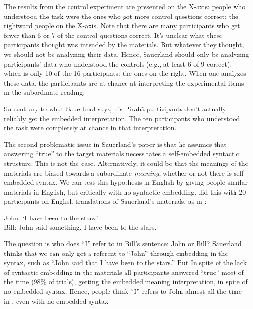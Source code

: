 \documentclass{article}
\begin{document}
The results from the control experiment are presented on the X-axis:  people who understood the task were the ones who got more control questions correct: the rightward people on the X-axis.  Note that there are many participants who get fewer than 6 or 7 of the control questions correct.  It's unclear what these participants thought was intended by the materials.  But whatever they thought, we should not be analyzing their data. Hence, Sauerland should only be analyzing participants’ data who understood the controls (e.g., at least 6 of 9 correct):  which is only 10 of the 16 participants: the ones on the right. When one analyzes these data, the participants are at chance at interpreting the experimental items in the subordinate reading.

So contrary to what Sauerland says, his Pirahã participants don’t actually reliably get the embedded interpretation. The ten participants who understood the task were completely at chance in that interpretation.

The second problematic issue in Sauerland's paper is that he assumes that answering ``true'' to the target materials necessitates a self-embedded syntactic structure.  This is not the case.  Alternatively, it could be that the meanings of the materials are biased towards a subordinate \textit{meaning}, whether or not there is self-embedded syntax.  We can test this hypothesis in English by giving people similar materials in English, but critically with no syntactic embedding.  \cite{everett2019recursion} did this with 20 participants on English translations of Sauerland's materials, as in : 

\begin{myexample}
\label{ev_gib2019_ex}
John: ‘I have been to the stars.’\\
Bill: John said something. I have been to the stars.
\end{myexample}

The question is who does ``I'' refer to in Bill’s sentence:  John or Bill? Sauerland thinks that we can only get a referent to ``John'' through embedding in the syntax, such as ``John said that I have been to the stars.''  But In spite of the lack of syntactic embedding in the materials all participants answered ``true'' most of the time (98\% of trials), getting the embedded meaning interpretation, in spite of no embedded syntax.  Hence, people think ``I'' refers to John almost all the time in , even with no embedded syntax
\end{document}

